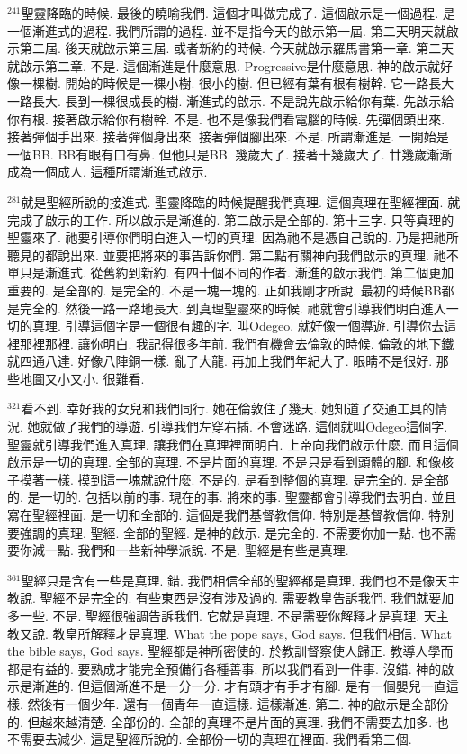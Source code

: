 \documentclass{book}
\begin{document}
$^{241}$聖靈降臨的時候.
最後的曉喻我們.
這個才叫做完成了.
這個啟示是一個過程.
是一個漸進式的過程.
我們所謂的過程.
並不是指今天的啟示第一屆.
第二天明天就啟示第二屆.
後天就啟示第三屆.
或者新約的時候.
今天就啟示羅馬書第一章.
第二天就啟示第二章.
不是.
這個漸進是什麼意思.
Progressive是什麼意思.
神的啟示就好像一棵樹.
開始的時候是一棵小樹.
很小的樹.
但已經有葉有根有樹幹.
它一路長大一路長大.
長到一棵很成長的樹.
漸進式的啟示.
不是說先啟示給你有葉.
先啟示給你有根.
接著啟示給你有樹幹.
不是.
也不是像我們看電腦的時候.
先彈個頭出來.
接著彈個手出來.
接著彈個身出來.
接著彈個腳出來.
不是.
所謂漸進是.
一開始是一個BB.
BB有眼有口有鼻.
但他只是BB.
幾歲大了.
接著十幾歲大了.
廿幾歲漸漸成為一個成人.
這種所謂漸進式啟示.

$^{281}$就是聖經所說的接進式.
聖靈降臨的時候提醒我們真理.
這個真理在聖經裡面.
就完成了啟示的工作.
所以啟示是漸進的.
第二啟示是全部的.
第十三字.
只等真理的聖靈來了.
祂要引導你們明白進入一切的真理.
因為祂不是憑自己說的.
乃是把祂所聽見的都說出來.
並要把將來的事告訴你們.
第二點有關神向我們啟示的真理.
祂不單只是漸進式.
從舊約到新約.
有四十個不同的作者.
漸進的啟示我們.
第二個更加重要的.
是全部的.
是完全的.
不是一塊一塊的.
正如我剛才所說.
最初的時候BB都是完全的.
然後一路一路地長大.
到真理聖靈來的時候.
祂就會引導我們明白進入一切的真理.
引導這個字是一個很有趣的字.
叫Odegeo.
就好像一個導遊.
引導你去這裡那裡那裡.
讓你明白.
我記得很多年前.
我們有機會去倫敦的時候.
倫敦的地下鐵就四通八達.
好像八陣銅一樣.
亂了大龍.
再加上我們年紀大了.
眼睛不是很好.
那些地圖又小又小.
很難看.

$^{321}$看不到.
幸好我的女兒和我們同行.
她在倫敦住了幾天.
她知道了交通工具的情況.
她就做了我們的導遊.
引導我們左穿右插.
不會迷路.
這個就叫Odegeo這個字.
聖靈就引導我們進入真理.
讓我們在真理裡面明白.
上帝向我們啟示什麼.
而且這個啟示是一切的真理.
全部的真理.
不是片面的真理.
不是只是看到頭體的腳.
和像核子摸著一樣.
摸到這一塊就說什麼.
不是的.
是看到整個的真理.
是完全的.
是全部的.
是一切的.
包括以前的事.
現在的事.
將來的事.
聖靈都會引導我們去明白.
並且寫在聖經裡面.
是一切和全部的.
這個是我們基督教信仰.
特別是基督教信仰.
特別要強調的真理.
聖經.
全部的聖經.
是神的啟示.
是完全的.
不需要你加一點.
也不需要你減一點.
我們和一些新神學派說.
不是.
聖經是有些是真理.

$^{361}$聖經只是含有一些是真理.
錯.
我們相信全部的聖經都是真理.
我們也不是像天主教說.
聖經不是完全的.
有些東西是沒有涉及過的.
需要教皇告訴我們.
我們就要加多一些.
不是.
聖經很強調告訴我們.
它就是真理.
不是需要你解釋才是真理.
天主教又說.
教皇所解釋才是真理.
What the pope says, God says.
但我們相信.
What the bible says, God says.
聖經都是神所密使的.
於教訓督察使人歸正.
教導人學而都是有益的.
要熟成才能完全預備行各種善事.
所以我們看到一件事.
沒錯.
神的啟示是漸進的.
但這個漸進不是一分一分.
才有頭才有手才有腳.
是有一個嬰兒一直這樣.
然後有一個少年.
還有一個青年一直這樣.
這樣漸進.
第二.
神的啟示是全部份的.
但越來越清楚.
全部份的.
全部的真理不是片面的真理.
我們不需要去加多.
也不需要去減少.
這是聖經所說的.
全部份一切的真理在裡面.
我們看第三個.
\end{document}
